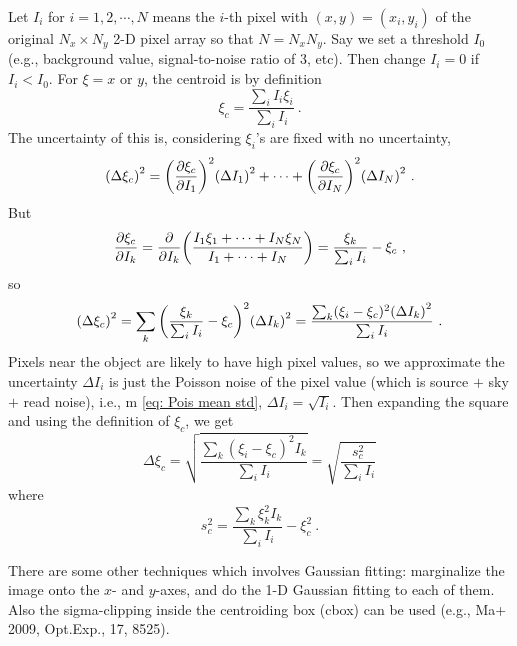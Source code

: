 
Let $ I_i $ for $ i = 1, 2, \cdots , N $ means the $ i $-th pixel with $ (x, y) = (x_i, y_i) $ of the original $ N_x \times N_y $ 2-D pixel array so that $ N = N_x N_y $. Say we set a threshold $ I_0 $ (e.g., background value, signal-to-noise ratio of 3, etc). Then change $ I_i = 0 $ if $ I_i < I_0 $. For $ \xi = x $ or $ y $, the centroid is by definition
\begin{equation} \label{eq: centroid}
  \xi_c = \frac{\sum_i I_i \xi_i}{\sum_i I_i} ~.
\end{equation}
The uncertainty of this is, considering $ \xi_i $'s are fixed with no uncertainty,
\begin{equation}
  \qty (\Delta \xi_c)^2
    = \qty(\pdv{\xi_c}{I_1})^2 \qty(\Delta I_1)^2 
      + \cdots + \qty(\pdv{\xi_c}{I_N})^2 \qty(\Delta I_N)^2 ~.
\end{equation}
But
\begin{equation}
  \pdv{\xi_c}{I_k} 
    = \pdv{I_k} \qty( \frac{I_1 \xi_1 + \cdots + I_N \xi_N}{I_1 + \cdots + I_N} )
    = \frac{\xi_k}{\sum_i I_i} - \xi_c ~,
\end{equation}
so
\begin{equation}
  \qty (\Delta \xi_c)^2
  = \sum_k \qty(\frac{\xi_k}{\sum_i I_i} - \xi_c)^2 \qty(\Delta I_k)^2
  = \frac{\sum_k (\xi_i - \xi_c)^2 \qty(\Delta I_k)^2}{\sum_i I_i} ~.
\end{equation}
Pixels near the object are likely to have high pixel values, so we approximate the uncertainty $ \Delta I_i $ is just the Poisson noise of the pixel value (which is source $ + $ sky $ + $ read noise), i.e., m \cref{eq: Pois mean std}, $ \Delta I_i = \sqrt{I_i} $. Then expanding the square and using the definition of $ \xi_c $, we get
\begin{equation} \label{eq: centroid err}
  \Delta \xi_c 
  = \sqrt{\frac{\sum_k (\xi_i - \xi_c)^2 I_k }{\sum_i I_i} }
  = \sqrt{\frac{s_c^2}{\sum_i I_i}}
\end{equation}
where
\begin{equation}
  s_c^2 = \frac{\sum_k \xi_k^2 I_k}{\sum_i I_i} - \xi_c^2 ~.
\end{equation}


There are some other techniques which involves Gaussian fitting: marginalize the image onto the $ x $- and $ y $-axes, and do the 1-D Gaussian fitting to each of them. Also the sigma-clipping inside the centroiding box (cbox) can be used (e.g., Ma+ 2009, Opt.Exp., 17, 8525).

